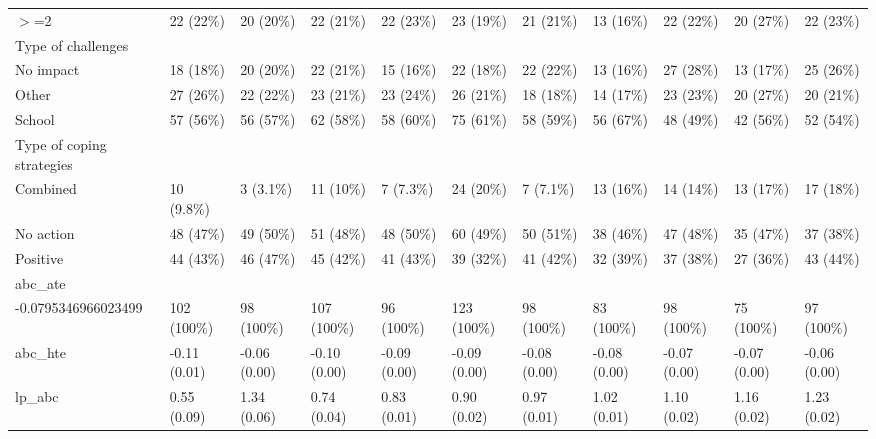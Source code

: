 \begin{table}[ht]
\begin{tabular}{lllllllllll}
  $>$=2 & 22 (22\%) & 20 (20\%) & 22 (21\%) & 22 (23\%) & 23 (19\%) & 21 (21\%) & 13 (16\%) & 22 (22\%) & 20 (27\%) & 22 (23\%) \\ 
  Type of challenges &  &  &  &  &  &  &  &  &  &  \\ 
  No impact & 18 (18\%) & 20 (20\%) & 22 (21\%) & 15 (16\%) & 22 (18\%) & 22 (22\%) & 13 (16\%) & 27 (28\%) & 13 (17\%) & 25 (26\%) \\ 
  Other & 27 (26\%) & 22 (22\%) & 23 (21\%) & 23 (24\%) & 26 (21\%) & 18 (18\%) & 14 (17\%) & 23 (23\%) & 20 (27\%) & 20 (21\%) \\ 
  School & 57 (56\%) & 56 (57\%) & 62 (58\%) & 58 (60\%) & 75 (61\%) & 58 (59\%) & 56 (67\%) & 48 (49\%) & 42 (56\%) & 52 (54\%) \\ 
  Type of coping strategies &  &  &  &  &  &  &  &  &  &  \\ 
  Combined & 10 (9.8\%) & 3 (3.1\%) & 11 (10\%) & 7 (7.3\%) & 24 (20\%) & 7 (7.1\%) & 13 (16\%) & 14 (14\%) & 13 (17\%) & 17 (18\%) \\ 
  No action & 48 (47\%) & 49 (50\%) & 51 (48\%) & 48 (50\%) & 60 (49\%) & 50 (51\%) & 38 (46\%) & 47 (48\%) & 35 (47\%) & 37 (38\%) \\ 
  Positive & 44 (43\%) & 46 (47\%) & 45 (42\%) & 41 (43\%) & 39 (32\%) & 41 (42\%) & 32 (39\%) & 37 (38\%) & 27 (36\%) & 43 (44\%) \\ 
  abc\_ate &  &  &  &  &  &  &  &  &  &  \\ 
  -0.0795346966023499 & 102 (100\%) & 98 (100\%) & 107 (100\%) & 96 (100\%) & 123 (100\%) & 98 (100\%) & 83 (100\%) & 98 (100\%) & 75 (100\%) & 97 (100\%) \\ 
  abc\_hte & -0.11 (0.01) & -0.06 (0.00) & -0.10 (0.00) & -0.09 (0.00) & -0.09 (0.00) & -0.08 (0.00) & -0.08 (0.00) & -0.07 (0.00) & -0.07 (0.00) & -0.06 (0.00) \\ 
  lp\_abc & 0.55 (0.09) & 1.34 (0.06) & 0.74 (0.04) & 0.83 (0.01) & 0.90 (0.02) & 0.97 (0.01) & 1.02 (0.01) & 1.10 (0.02) & 1.16 (0.02) & 1.23 (0.02) \\ 
   \hline
\end{tabular}
\end{table}

